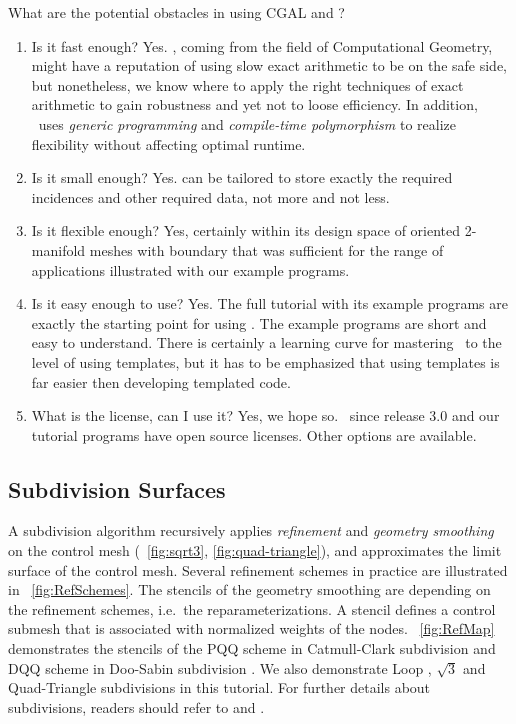 What are the potential obstacles in using CGAL and \cgalpoly?
\begin{enumerate}
  \item
    Is it fast enough? Yes. \cgal, coming from the field of Computational
    Geometry, might have a reputation of using slow exact arithmetic
    to be on the safe side, but nonetheless, we know where to apply
    the right techniques of exact arithmetic to gain robustness and
    yet not to loose efficiency. In addition, \cgal\ uses
    \emph{generic programming\/} and \emph{compile-time
    polymorphism\/} to realize flexibility without affecting optimal
    runtime.
  \item
    Is it small enough? Yes.  can be
    tailored to store exactly the required incidences and other
    required data, not more and not less.
  \item
    Is it flexible enough? Yes, certainly within its design
    space of oriented 2-manifold meshes with boundary that was
    sufficient for the range of applications illustrated with our
    example programs. 
  \item
    Is it easy enough to use? Yes. The full tutorial with its example
    programs are exactly the starting point for using \cgalpoly. The
    example programs are short and easy to understand. There is
    certainly a learning curve for mastering \CC\ to the level
    of using templates, but it has to be emphasized that
    using templates is far easier then developing templated code.
  \item
    What is the license, can I use it? Yes, we hope so. \cgal\ since
    release 3.0 and our tutorial programs have open source
    licenses. Other options are available.
\end{enumerate}

\subsection{Subdivision Surfaces}

A subdivision algorithm recursively 
applies \emph{refinement} and \emph{geometry smoothing} 
on the control mesh (\figurename\ \ref{fig:sqrt3},  
\ref{fig:quad-triangle}), 
and approximates the limit surface of the control mesh.  Several
refinement schemes in practice are illustrated in
\figurename\ \ref{fig:RefSchemes}. The stencils of the
geometry smoothing are depending on the refinement schemes, 
i.e.\ the reparameterizations. A stencil defines a control
submesh that is associated with normalized weights of the 
nodes. \figurename\ \ref{fig:RefMap} 
demonstrates the stencils of the PQQ scheme  
in Catmull-Clark subdivision \cite{cc} and DQQ scheme in Doo-Sabin
subdivision \cite{ds}. We also demonstrate Loop \cite{loop}, 
$\sqrt{3}$ \cite{sqrt3} and Quad-Triangle \cite{qts} subdivisions 
in this tutorial. For further details about subdivisions, readers
should refer to \cite{Warren:subdivision} and \cite{Sub:course:2000}.
   
